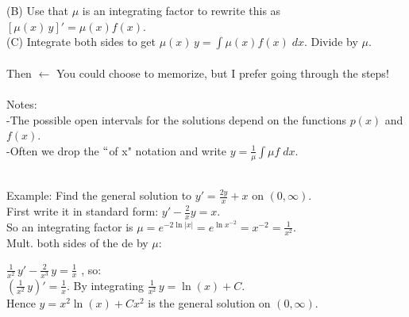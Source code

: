 \documentclass{ximera}
\begin{document}
 (B) Use that $\mu$ is an integrating factor to rewrite this as $[\mu (x)\, y]'=\mu (x)f(x)$.\\

 (C) Integrate both sides to get $\displaystyle \mu(x)\, y=\int \mu (x)f(x)\;dx$.  Divide by $\mu$.\\ \\

Then    $\leftarrow$ You could choose to memorize, but I prefer going through the steps!\\ \\

 Notes: \\

 -The possible open intervals for the solutions depend on the functions $p(x)$ and $f(x)$.\\

 -Often we drop the $``$of x" notation and write $\displaystyle y=\frac{1}{\mu } \int \mu f \;dx$.\\ \\
\bigskip

 Example: Find the general solution to $y'=\frac{2y}{x}+x$ on $(0,\infty)$. \\

  First write it in standard form:    $y'-\frac{2}{x}y=x$.\\ 
 
  So an integrating factor is  $\mu =e^{-2\ln{|x|}}=  e^{\ln{x^{-2}}}=x^{-2}=\frac{1}{x^2}$.\\
 
 Mult. both sides of the de by $\mu$: 
 
 $\frac{1}{x^2}\,y' -\frac{2}{x^3}\, y=\frac{1}{x}$  , so:\\

 $\left(\frac{1}{x^2}\,y \right)'=\frac{1}{x}$.  By integrating  $\frac{1}{x^2}\,y=\ln{(x)}+C$. \\

 Hence $y=x^2\ln{(x)}+Cx^2$ is the general solution on $(0,\infty)$.
\end{document}
